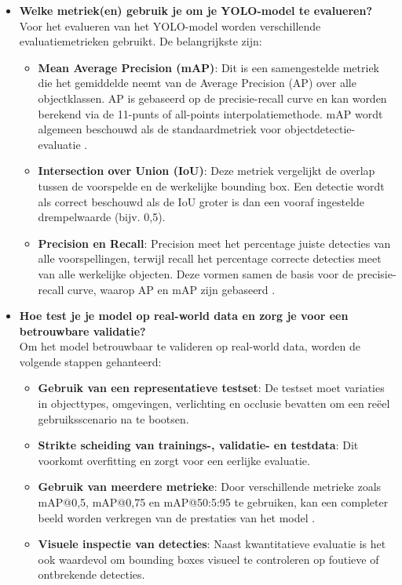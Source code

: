 \begin{itemize}
    \item \textbf{Welke metriek(en) gebruik je om je YOLO-model te evalueren?} \\
    Voor het evalueren van het YOLO-model worden verschillende evaluatiemetrieken gebruikt. De belangrijkste zijn:
    \begin{itemize}
        \item \textbf{Mean Average Precision (mAP)}: Dit is een samengestelde metriek die het gemiddelde neemt van de Average Precision (AP) over alle objectklassen. AP is gebaseerd op de precisie-recall curve en kan worden berekend via de 11-punts of all-points interpolatiemethode. mAP wordt algemeen beschouwd als de standaardmetriek voor objectdetectie-evaluatie \autocite{Padilla2020}.
        \item \textbf{Intersection over Union (IoU)}: Deze metriek vergelijkt de overlap tussen de voorspelde en de werkelijke bounding box. Een detectie wordt als correct beschouwd als de IoU groter is dan een vooraf ingestelde drempelwaarde (bijv. 0{,}5).
        \item \textbf{Precision en Recall}: Precision meet het percentage juiste detecties van alle voorspellingen, terwijl recall het percentage correcte detecties meet van alle werkelijke objecten. Deze vormen samen de basis voor de precisie-recall curve, waarop AP en mAP zijn gebaseerd \autocite{Padilla2020}.
    \end{itemize}

    \item \textbf{Hoe test je je model op real-world data en zorg je voor een betrouwbare validatie?} \\
    Om het model betrouwbaar te valideren op real-world data, worden de volgende stappen gehanteerd:
    \begin{itemize}
        \item \textbf{Gebruik van een representatieve testset}: De testset moet variaties in objecttypes, omgevingen, verlichting en occlusie bevatten om een reëel gebruiksscenario na te bootsen.
        \item \textbf{Strikte scheiding van trainings-, validatie- en testdata}: Dit voorkomt overfitting en zorgt voor een eerlijke evaluatie.
        \item \textbf{Gebruik van meerdere metrieke}: Door verschillende metrieke zoals mAP@0{,}5, mAP@0{,}75 en mAP@50:5:95 te gebruiken, kan een completer beeld worden verkregen van de prestaties van het model \autocite{Padilla2020}.
        \item \textbf{Visuele inspectie van detecties}: Naast kwantitatieve evaluatie is het ook waardevol om bounding boxes visueel te controleren op foutieve of ontbrekende detecties.
    \end{itemize}
\end{itemize}


